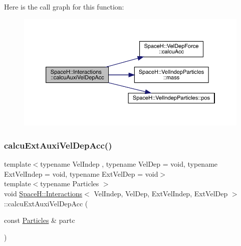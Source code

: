 Here is the call graph for this function\+:
\nopagebreak
\begin{figure}[H]
\begin{center}
\leavevmode
\includegraphics[width=350pt]{class_space_h_1_1_interactions_a738d79fa867f94cc9fcc5e0e017ed86b_cgraph}
\end{center}
\end{figure}
\mbox{\label{class_space_h_1_1_interactions_aaebe1aae63825dea150b3892e487da02}} 
\subsubsection{\texorpdfstring{calcu\+Ext\+Auxi\+Vel\+Dep\+Acc()}{calcuExtAuxiVelDepAcc()}}
{\footnotesize\ttfamily template$<$typename Vel\+Indep , typename Vel\+Dep  = void, typename Ext\+Vel\+Indep  = void, typename Ext\+Vel\+Dep  = void$>$ \\
template$<$typename Particles $>$ \\
void \mbox{\hyperlink{class_space_h_1_1_interactions}{Space\+H\+::\+Interactions}}$<$ Vel\+Indep, Vel\+Dep, Ext\+Vel\+Indep, Ext\+Vel\+Dep $>$\+::calcu\+Ext\+Auxi\+Vel\+Dep\+Acc (\begin{DoxyParamCaption}\item[{const \mbox{\hyperlink{struct_space_h_1_1_particles}{Particles}} \&}]{partc }\end{DoxyParamCaption})\hspace{0.3cm}{\ttfamily [inline]}}

